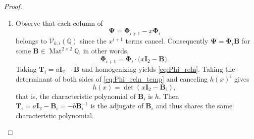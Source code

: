 \documentclass{article}
\numberwithin{equation}{section}
\theoremstyle{definition}
\theoremstyle{remark}
\DeclareMathOperator{\Mat}{Mat}
\newcommand{\QQ}{\mathbb{Q}}
\newcommand{\V}{\mathcal{V}}
\newcommand{\<}{\left\langle}
\renewcommand{\>}{\right\rangle}
\begin{document}
\begin{proof}
  \begin{enumerate}[label=\textup{(\alph*)}]
    \item Observe that each column of
    \begin{equation*}
      \boldsymbol{\Psi} = \boldsymbol{\Phi}_{i+1} - x \boldsymbol{\Phi}_i
    \end{equation*}
    belongs to $\V_{k,i}(\QQ)$ since the $x^{i+1}$ terms cancel. Consequently $\boldsymbol{\Psi} = \boldsymbol{\Phi}_i\mathbf{B}$ for some $\mathbf{B} \in \Mat^{2\times 2}\QQ$, in other words,
    \begin{equation} \label{eq:Phi_reln_temp}
      \boldsymbol{\Phi}_{i+1} = \boldsymbol{\Phi}_i \cdot \big(x \mathbf{I}_2 - \mathbf{B}\big).
    \end{equation}
    Taking $\mathbf{T}_i = a \mathbf{I}_2 - \mathbf{B}$ and homogenizing yields \eqref{eq:Phi_reln}. Taking the determinant of both sides of \eqref{eq:Phi_reln_temp} and canceling $h(x)^{i}$ gives
    \begin{equation*}
      h(x) = \det(x \mathbf{I}_2 - \mathbf{B}_i),
    \end{equation*}
    that is, the characteristic polynomial of $\mathbf{B}_i$ is $h$. Then $\mathbf{T}_i = a\mathbf{I}_2 - \mathbf{B}_i = -b\mathbf{B}_i^{-1}$ is the adjugate of $\mathbf{B}_i$ and thus shares the same characteristic polynomial.


\end{enumerate}
\end{proof}
\end{document}
